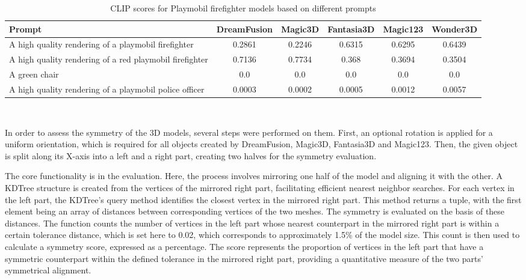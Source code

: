 \begin{table}[htbp]
    \centering
    \small
    \begin{tabular}{m{4cm}S[table-format=1.2]S[table-format=1.2]S[table-format=1.2]S[table-format=1.2]S[table-format=1.2]}
    \toprule
    {Prompt} & {DreamFusion} & {Magic3D} & {Fantasia3D} & {Magic123} & {Wonder3D} \\
    \midrule
    A high quality rendering of a playmobil firefighter & 0.2861 & 0.2246 & 0.6315 & 0.6295 & 0.6439 \\
    \midrule
    A high quality rendering of a red playmobil firefighter & 0.7136 & 0.7734 & 0.368 & 0.3694 & 0.3504 \\
    \midrule
    A green chair & 0.0 & 0.0 & 0.0 & 0.0 & 0.0 \\
    \midrule
    A high quality rendering of a playmobil police officer & 0.0003 & 0.0002 & 0.0005 & 0.0012 & 0.0057 \\
    \bottomrule 
    \end{tabular}
    \caption{CLIP scores for Playmobil firefighter models based on different prompts}~\label{table:scorePlaymobil}
\end{table}

In order to assess the symmetry of the 3D models, several steps were performed on them. First, an optional rotation is applied for a uniform orientation, which is required for all objects created by DreamFusion, Magic3D, Fantasia3D and Magic123. Then, the given object is split along its X-axis into a left and a right part, creating two halves for the symmetry evaluation.

The core functionality is in the evaluation. Here, the process involves mirroring one half of the model and aligning it with the other. A KDTree structure is created from the vertices of the mirrored right part, facilitating efficient nearest neighbor searches. For each vertex in the left part, the KDTree's query method identifies the closest vertex in the mirrored right part. This method returns a tuple, with the first element being an array of distances between corresponding vertices of the two meshes. The symmetry is evaluated on the basis of these distances. The function counts the number of vertices in the left part whose nearest counterpart in the mirrored right part is within a certain tolerance distance, which is set here to 0.02, which corresponds to approximately 1.5\% of the model size. This count is then used to calculate a symmetry score, expressed as a percentage. The score represents the proportion of vertices in the left part that have a symmetric counterpart within the defined tolerance in the mirrored right part, providing a quantitative measure of the two parts' symmetrical alignment.

